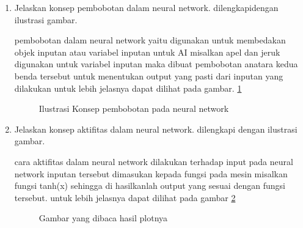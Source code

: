 \begin{enumerate}
\item Jelaskan konsep pembobotan  dalam neural network. dilengkapidengan ilustrasi gambar. \par
pembobotan dalam neural network yaitu digunakan untuk membedakan objek inputan atau variabel inputan untuk AI misalkan apel dan jeruk digunakan untuk variabel inputan maka dibuat pembobotan anatara kedua benda tersebut untuk menentukan output yang pasti dari inputan yang dilakukan untuk lebih jelasnya dapat dilihat pada gambar. \ref{c115}

\begin{figure}[!htbp]
      \caption{Ilustrasi Konsep pembobotan pada neural network}
      \label{c115}
      \end{figure}

\item Jelaskan konsep aktifitas dalam neural network. dilengkapi dengan ilustrasi gambar.\par

cara aktifitas dalam neural network dilakukan terhadap input pada neural network inputan tersebut dimasukan kepada fungsi pada mesin misalkan fungsi tanh(x) sehingga di hasilkanlah output yang sesuai dengan fungsi tersebut. untuk lebih jelasnya dapat dilihat pada gambar \ref{c116}

\begin{figure}[!htbp]
      \caption{Gambar yang dibaca hasil plotnya}
      \label{c116}
	   \end{figure}


\end{enumerate}

